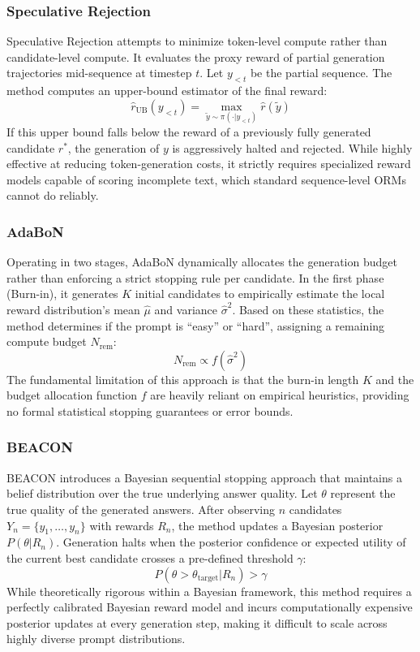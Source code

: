 \documentclass[a4paper,11pt]{article}
\begin{document}
\subsubsection{Speculative Rejection}
Speculative Rejection \cite{specrej2024} attempts to minimize token-level compute rather than candidate-level compute. It evaluates the proxy reward of partial generation trajectories mid-sequence at timestep $t$. Let $y_{<t}$ be the partial sequence. The method computes an upper-bound estimator of the final reward:
\begin{equation}
\hat{r}_{\text{UB}}(y_{<t}) = \max_{\tilde{y} \sim \pi(\cdot|y_{<t})} \hat{r}(\tilde{y})
\end{equation}
If this upper bound falls below the reward of a previously fully generated candidate $r^*$, the generation of $y$ is aggressively halted and rejected. While highly effective at reducing token-generation costs, it strictly requires specialized reward models capable of scoring incomplete text, which standard sequence-level ORMs cannot do reliably.

\subsubsection{AdaBoN}
\label{sec:adabon}
Operating in two stages, AdaBoN \cite{adabon2025} dynamically allocates the generation budget rather than enforcing a strict stopping rule per candidate. In the first phase (Burn-in), it generates $K$ initial candidates to empirically estimate the local reward distribution's mean $\hat{\mu}$ and variance $\hat{\sigma}^2$. Based on these statistics, the method determines if the prompt is ``easy'' or ``hard'', assigning a remaining compute budget $N_{\text{rem}}$:
\begin{equation}
N_{\text{rem}} \propto f(\hat{\sigma}^2)
\end{equation}
The fundamental limitation of this approach is that the burn-in length $K$ and the budget allocation function $f$ are heavily reliant on empirical heuristics, providing no formal statistical stopping guarantees or error bounds.

\subsubsection{BEACON}
\label{sec:beacon}
BEACON \cite{beacon2025} introduces a Bayesian sequential stopping approach that maintains a belief distribution over the true underlying answer quality. Let $\theta$ represent the true quality of the generated answers. After observing $n$ candidates $Y_n = \{y_1, \ldots, y_n\}$ with rewards $R_n$, the method updates a Bayesian posterior $P(\theta | R_n)$. Generation halts when the posterior confidence or expected utility of the current best candidate crosses a pre-defined threshold $\gamma$:
\begin{equation}
P(\theta > \theta_{\text{target}} | R_n) > \gamma
\end{equation}
While theoretically rigorous within a Bayesian framework, this method requires a perfectly calibrated Bayesian reward model and incurs computationally expensive posterior updates at every generation step, making it difficult to scale across highly diverse prompt distributions.
\end{document}
